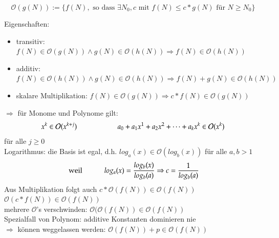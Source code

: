 \documentclass[11pt, fleqn]{scrreprt}
\begin{document}
\[\mathcal O(g(N)) := \biggl\lbrace f(N), \text{ so dass } \exists N_0, c \text{ mit } f(N) \leq c * g(N) \text{ für } N \geq N_0 \biggr\rbrace\]

Eigenschaften:
\begin{itemize}
    \item transitiv: $f(N) \in \mathcal O(g(N)) \land g(N) \in \mathcal O(h(N)) \Rightarrow f(N) \in \mathcal O(h(N))$
    \item additiv: $f(N) \in \mathcal O(h(N)) \land g(N) \in \mathcal O(h(N)) \Rightarrow f(N) + g(N) \in \mathcal O(h(N))$
    \item skalare Multiplikation: $f(N) \in \mathcal O(g(N)) \Rightarrow c* f(N) \in \mathcal O(g(N)) $
\end{itemize}

$\Rightarrow$ für Monome und Polynome gilt:
\[ x^k \in \mathcal O(x^{k+j}) \hspace*{2cm} a_0 + a_1x^1 + a_2x^2 + \dots + a_kx^k \in \mathcal O(x^k)\]
für alle $j \geq 0$ \\
Logarithmus: die Basis ist egal, d.h. $log_a(x) \in \mathcal O(log_b(x))$ für alle $a,b >1$
\[ \text{ weil  }\hspace*{1cm} log_a(x) = \frac{log_b(x)}{log_b(a)} \Rightarrow c = \frac{1}{log_b(a)}\]
Aus Multiplikation folgt auch\hspace*{1cm} $c* \mathcal O(f(N)) \in \mathcal O(f(N))$ \\
\hspace*{6cm} $\mathcal O(c*f(N)) \in \mathcal O(f(N))$ \\

mehrere $\mathcal O$'s verschwinden: $ \mathcal O( \mathcal O(f(N)) \in \mathcal O (f(N))$ \\

Spezialfall von Polynom: additive Konstanten dominieren nie \\
\hspace*{1cm}$\Rightarrow$ können weggelassen werden: $\mathcal O(f(N)) + p \in \mathcal O(f(N))$
\end{document}
